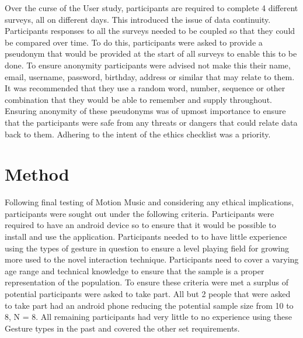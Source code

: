 \documentclass{l4proj}
\begin{document}
Over the curse of the User study, participants are required to complete 4 different surveys, all on different days. This introduced the issue of data continuity. Participants responses to all the surveys needed to be coupled so that they could be compared over time. To do this, participants were asked to provide a pseudonym that would be provided at the start of all surveys to enable this to be done. To ensure anonymity participants were advised not make this their name, email, username, password, birthday, address or similar that may relate to them. It was recommended that they use a random word, number, sequence or other combination that they would be able to remember and supply throughout. Ensuring anonymity of these pseudonyms was of upmost importance to ensure that the participants were safe from any threats or dangers that could relate data back to them. Adhering to the intent of the ethics checklist was a priority.

\section{Method}
Following final testing of Motion Music and considering any ethical implications, participants were sought out under the following criteria. Participants were required to have an android device so to ensure that it would be possible to install and use the application. Participants needed to to have little experience using the types of gesture in question to ensure a level playing field for growing more used to the novel interaction technique. Participants need to cover a varying age range and technical knowledge to ensure that the sample is a proper representation of the population. To ensure these criteria were met a surplus of potential participants were asked to take part. All but 2 people that were asked to take part had an android phone reducing the potential sample size from 10 to 8, N = 8. All remaining participants had very little to no experience using these Gesture types in the past and covered the other set requirements.
\end{document}

